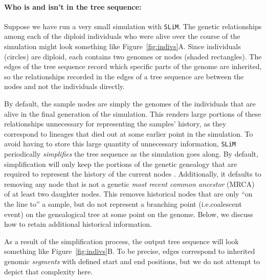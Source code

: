 \documentclass[12pt]{article}
\newcommand{\slim}[0]{\texttt{SLiM}\xspace}
\newcommand*{\ie}{i.e.\xcomma}
\begin{document}
\paragraph{Who is and isn't in the tree sequence:}
Suppose we have run a very small simulation with \slim. The genetic relationships among each of the
diploid individuals who were alive over the course of the simulation might
look something like Figure~\ref{fig:indivs}A. Since individuals (circles) are diploid, each contains
two genomes or nodes (shaded rectangles).
The edges of the tree sequence record which specific parts of the genome are inherited,
so the relationships recorded in the edges of a tree sequence are between the nodes and not the individuals directly.

By default, the sample nodes are simply the genomes of the individuals that are alive in the final generation
of the simulation. This renders large portions of these relationships unnecessary for representing the samples' history,
as they correspond to lineages that died out at some earlier point in the simulation.
To avoid having to
store this large quantity of unnecessary information, \slim periodically \textit{simplifies} the tree sequence
as the simulation goes along. By default, simplification will only keep the portions of the
genetic genealogy that are required to represent the history of the current nodes \citep{kelleher_efficient_2018}.
Additionally, it defaults to removing any node that is not a genetic
\textit{most recent common ancestor} (MRCA) of at least two daughter nodes. This removes historical
nodes that are only ``on the line to'' a sample, but do not represent a branching point
(\ie coalescent event) on the genealogical tree at some point on the genome.
Below, we discuss how to retain additional historical information.

As a result of the simplification process, the output tree sequence will look something like Figure~\ref{fig:indivs}B.
To be precise, edges correspond to inherited genomic \emph{segments} with defined start and end positions,
but we do not attempt to depict that complexity here.
\end{document}
